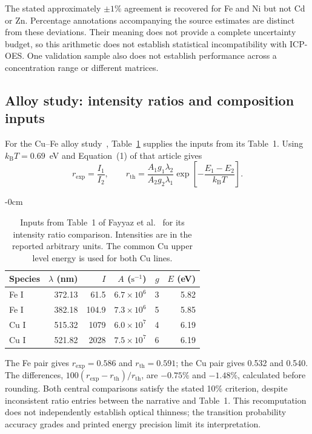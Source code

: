 \documentclass[11pt]{article}
\newlength{\extralength}
\begin{document}
The stated approximately $\pm1\%$ agreement is recovered for Fe and Ni but not Cd or Zn. Percentage annotations accompanying the source estimates are distinct from these deviations. Their meaning does not provide a complete uncertainty budget, so this arithmetic does not establish statistical incompatibility with ICP-OES. One validation sample also does not establish performance across a concentration range or different matrices.

\subsection{Alloy study: intensity ratios and composition inputs}\label{sec:published-alloy}
For the Cu--Fe alloy study~\cite{Fayyaz2023}, Table~\ref{tab:published-alloy} supplies the inputs from its Table~1. Using $k_{\mathrm B}T=0.69$~eV and Equation~(1) of that article gives
\[
r_{\mathrm{exp}}=\frac{I_1}{I_2},\qquad
r_{\mathrm{th}}=\frac{A_1g_1\lambda_2}{A_2g_2\lambda_1}
\exp\left[-\frac{E_1-E_2}{k_{\mathrm B}T}\right].
\]

\begin{table}[htbp]
\begin{adjustwidth}{-\extralength}{0cm}
\caption{Inputs from Table~1 of Fayyaz et al.~\cite{Fayyaz2023} for its intensity ratio comparison. Intensities are in the reported arbitrary units. The common Cu upper level energy is used for both Cu lines.}\label{tab:published-alloy}
\centering\small
\begin{tabular}{@{}lrrrrr@{}}\toprule
Species&$\lambda$ (nm)&$I$&$A$ ($\mathrm{s^{-1}}$)&$g$&$E$ (eV)\\\midrule
Fe I&372.13&61.5&$6.7\times10^6$&3&5.82\\
Fe I&382.18&104.9&$7.3\times10^6$&5&5.85\\
Cu I&515.32&1079&$6.0\times10^7$&4&6.19\\
Cu I&521.82&2028&$7.5\times10^7$&6&6.19\\
\bottomrule
\end{tabular}
\end{adjustwidth}
\end{table}

The Fe pair gives $r_{\mathrm{exp}}=0.586$ and $r_{\mathrm{th}}=0.591$; the Cu pair gives 0.532 and 0.540. The differences, $100(r_{\mathrm{exp}}-r_{\mathrm{th}})/r_{\mathrm{th}}$, are $-0.75\%$ and $-1.48\%$, calculated before rounding. Both central comparisons satisfy the stated 10\% criterion, despite inconsistent ratio entries between the narrative and Table~1. This recomputation does not independently establish optical thinness; the transition probability accuracy grades and printed energy precision limit its interpretation.
\end{document}
